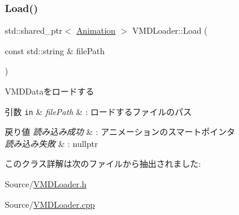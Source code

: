\subsubsection{\texorpdfstring{Load()}{Load()}}
{\footnotesize\ttfamily std\+::shared\+\_\+ptr$<$ \mbox{\hyperlink{class_animation}{Animation}} $>$ V\+M\+D\+Loader\+::\+Load (\begin{DoxyParamCaption}\item[{const std\+::string \&}]{file\+Path }\end{DoxyParamCaption})}



V\+M\+D\+Dataをロードする 


\begin{DoxyParams}[1]{引数}
\mbox{\tt in}  & {\em file\+Path} & \+: ロードするファイルのパス \\
\hline
\end{DoxyParams}

\begin{DoxyRetVals}{戻り値}
{\em 読み込み成功} & \+: アニメーションのスマートポインタ \\
\hline
{\em 読み込み失敗} & \+: nullptr \\
\hline
\end{DoxyRetVals}


このクラス詳解は次のファイルから抽出されました\+:\begin{DoxyCompactItemize}
\item 
Source/\mbox{\hyperlink{_v_m_d_loader_8h}{V\+M\+D\+Loader.\+h}}\item 
Source/\mbox{\hyperlink{_v_m_d_loader_8cpp}{V\+M\+D\+Loader.\+cpp}}\end{DoxyCompactItemize}
